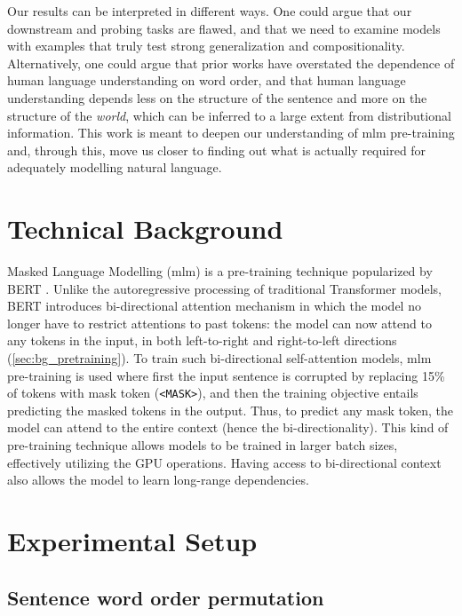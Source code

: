 \documentclass[letterpaper, 12pt]{report}
\begin{document}
Our results can be interpreted in different ways.
One could argue that our downstream and probing tasks are flawed, and that we need to examine models with examples that truly test strong generalization and compositionality.
Alternatively, one could argue that prior works have overstated the dependence of human language understanding on word order, and that human language understanding depends less on the structure of the sentence and more on the structure of the \emph{world}, which can be inferred to a large extent from distributional information.
This work is meant to deepen our understanding of \acrshort{mlm} pre-training and, through this, move us closer to finding out what is actually required for adequately modelling natural language.



\section{Technical Background}
\label{sec:mlm_bg}

Masked Language Modelling (\acrshort{mlm}) is a pre-training technique popularized by BERT \citep{devlin-etal-2019-bert}. Unlike the autoregressive processing of traditional Transformer \citep{vaswani-etal-2017-attention} models, BERT introduces bi-directional attention mechanism in which the model no longer have to restrict attentions to past tokens: the model can now attend to any tokens in the input, in both left-to-right and right-to-left directions (\autoref{sec:bg_pretraining}). To train such bi-directional self-attention models, \acrshort{mlm} pre-training is used where first the input sentence is corrupted by replacing 15\% of tokens with mask token (\texttt{<MASK>}), and then the training objective entails predicting the masked tokens in the output. Thus, to predict any mask token, the model can attend to the entire context (hence the bi-directionality). This kind of pre-training technique allows models to be trained in larger batch sizes, effectively utilizing the GPU operations. Having access to bi-directional context also allows the model to learn long-range dependencies.

\section{Experimental Setup}
\label{sec:mlm_experimental_setup}


\subsection{Sentence word order permutation}
\label{sec:mlm_sentence_permutation}
\end{document}
